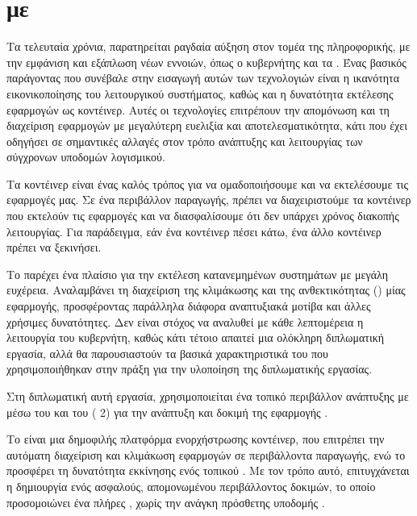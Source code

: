 \FloatBarrier



\section{ με }

Τα τελευταία χρόνια, παρατηρείται ραγδαία αύξηση στον τομέα της πληροφορικής, 
με την εμφάνιση και εξάπλωση νέων εννοιών, όπως ο κυβερνήτης και τα . 
Ένας βασικός παράγοντας που συνέβαλε στην εισαγωγή αυτών των τεχνολογιών είναι η ικανότητα εικονικοποίησης 
του λειτουργικού συστήματος, καθώς και η δυνατότητα εκτέλεσης εφαρμογών ως κοντέινερ. 
Αυτές οι τεχνολογίες επιτρέπουν την απομόνωση και τη διαχείριση εφαρμογών με μεγαλύτερη ευελιξία και 
αποτελεσματικότητα, κάτι που έχει οδηγήσει σε σημαντικές αλλαγές στον τρόπο ανάπτυξης και λειτουργίας των σύγχρονων υποδομών λογισμικού.

Τα κοντέινερ είναι ένας καλός τρόπος για να ομαδοποιήσουμε και να εκτελέσουμε τις εφαρμογές μας. 
Σε ένα περιβάλλον παραγωγής, πρέπει να διαχειριστούμε τα κοντέινερ που εκτελούν τις εφαρμογές και να 
διασφαλίσουμε ότι δεν υπάρχει χρόνος διακοπής λειτουργίας. Για παράδειγμα, εάν ένα κοντέινερ πέσει κάτω, ένα άλλο κοντέινερ πρέπει να ξεκινήσει. 

Το  παρέχει ένα πλαίσιο για την εκτέλεση κατανεμημένων συστημάτων με μεγάλη ευχέρεια. Αναλαμβάνει τη διαχείριση της κλιμάκωσης και της ανθεκτικότητας () μίας εφαρμογής, προσφέροντας παράλληλα διάφορα αναπτυξιακά μοτίβα και άλλες χρήσιμες δυνατότητες. Δεν είναι στόχος να αναλυθεί με κάθε λεπτομέρεια η λειτουργία του κυβερνήτη, καθώς κάτι τέτοιο απαιτεί μια ολόκληρη διπλωματική εργασία, αλλά θα παρουσιαστούν τα βασικά χαρακτηριστικά του που χρησιμοποιήθηκαν στην πράξη για την υλοποίηση της διπλωματικής εργασίας.



Στη διπλωματική αυτή εργασία, χρησιμοποιείται ένα τοπικό περιβάλλον 
ανάπτυξης με  μέσω του  και του 
( 2) για την ανάπτυξη και δοκιμή 
της εφαρμογής . 

Το  είναι μια δημοφιλής 
πλατφόρμα ενορχήστρωσης κοντέινερ, που επιτρέπει την αυτόματη 
διαχείριση και κλιμάκωση εφαρμογών σε περιβάλλοντα παραγωγής, 
ενώ το  προσφέρει τη δυνατότητα εκκίνησης ενός 
τοπικού . 
Με τον τρόπο αυτό, επιτυγχάνεται η δημιουργία ενός ασφαλούς, 
απομονωμένου περιβάλλοντος δοκιμών, το οποίο προσομοιώνει ένα 
πλήρες , χωρίς την ανάγκη πρόσθετης υποδομής .

